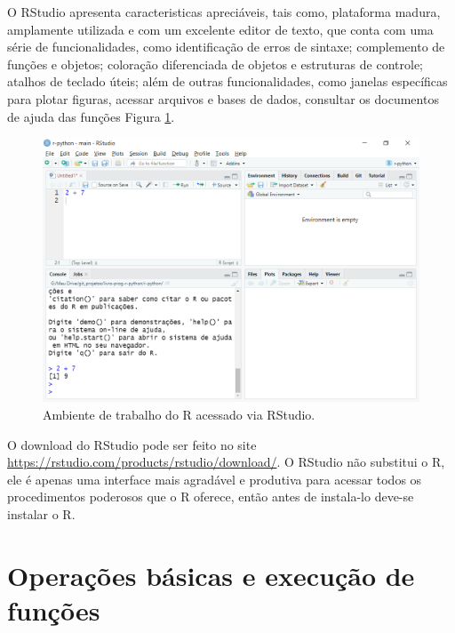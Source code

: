 \documentclass[
  11pt,
  a5paper,
  openany]{book}
\begin{document}
O RStudio apresenta caracteristicas apreciáveis, tais como, plataforma madura, amplamente utilizada e com um excelente editor de texto, que conta com uma série de funcionalidades, como identificação de erros de sintaxe; complemento de funções e objetos; coloração diferenciada de objetos e estruturas de controle; atalhos de teclado úteis; além de outras funcionalidades, como janelas específicas para plotar figuras, acessar arquivos e bases de dados, consultar os documentos de ajuda das funções Figura \ref{fig:FigRrstudio}.

\begin{figure}

{\centering \includegraphics[width=1\linewidth]{images/Fig_R_rstudio} 

}

\caption{Ambiente de trabalho do R acessado via RStudio.}\label{fig:FigRrstudio}
\end{figure}

O download do RStudio pode ser feito no site \url{https://rstudio.com/products/rstudio/download/}. O RStudio não substitui o R, ele é apenas uma interface mais agradável e produtiva para acessar todos os procedimentos poderosos que o R oferece, então antes de instala-lo deve-se instalar o R.

\hypertarget{operauxe7uxf5es-buxe1sicas-e-execuuxe7uxe3o-de-funuxe7uxf5es}{%
\section{Operações básicas e execução de funções}\label{operauxe7uxf5es-buxe1sicas-e-execuuxe7uxe3o-de-funuxe7uxf5es}}
\end{document}

